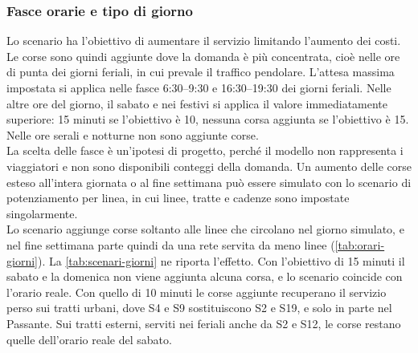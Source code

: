 \subsubsection{Fasce orarie e tipo di giorno}
Lo scenario ha l'obiettivo di aumentare il servizio limitando l'aumento dei costi. Le corse sono quindi aggiunte dove la domanda è più concentrata, cioè nelle ore di punta dei giorni feriali, in cui prevale il traffico pendolare. L'attesa massima impostata si applica nelle fasce 6:30--9:30 e 16:30--19:30 dei giorni feriali. Nelle altre ore del giorno, il sabato e nei festivi si applica il valore immediatamente superiore: 15 minuti se l'obiettivo è 10, nessuna corsa aggiunta se l'obiettivo è 15. Nelle ore serali e notturne non sono aggiunte corse. \\
La scelta delle fasce è un'ipotesi di progetto, perché il modello non rappresenta i viaggiatori e non sono disponibili conteggi della domanda. Un aumento delle corse esteso all'intera giornata o al fine settimana può essere simulato con lo scenario di potenziamento per linea, in cui linee, tratte e cadenze sono impostate singolarmente.\\

Lo scenario aggiunge corse soltanto alle linee che circolano nel giorno simulato, e nel fine settimana parte quindi da una rete servita da meno linee (\cref{tab:orari-giorni}). La \cref{tab:scenari-giorni} ne riporta l'effetto. Con l'obiettivo di 15 minuti il sabato e la domenica non viene aggiunta alcuna corsa, e lo scenario coincide con l'orario reale. Con quello di 10 minuti le corse aggiunte recuperano il servizio perso sui tratti urbani, dove S4 e S9 sostituiscono S2 e S19, e solo in parte nel Passante. Sui tratti esterni, serviti nei feriali anche da S2 e S12, le corse restano quelle dell'orario reale del sabato.

